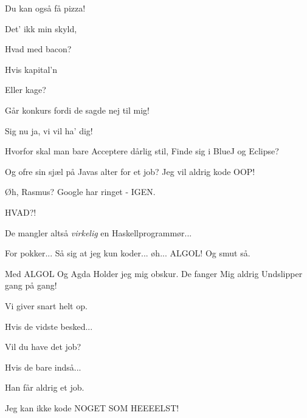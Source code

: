 \documentclass[a4paper,11pt]{article}
\begin{document}
\begin{song}
Du kan også få pizza!

Det' ikk min skyld,

Hvad med bacon?

Hvis kapital'n

Eller kage?

Går konkurs fordi de sagde nej til mig!

Sig nu ja, vi vil ha' dig!

Hvorfor skal man bare
Acceptere dårlig stil,
Finde sig i BlueJ og Eclipse?

Og ofre sin sjæl på
Javas alter for et job?
Jeg vil aldrig kode OOP!
\end{song}

\begin{sketch}

 Øh, Rasmus? Google har ringet - IGEN.

 HVAD?!

 De mangler altså \textit{virkelig} en Haskellprogrammør...

 For pokker... Så sig at jeg kun koder... øh... ALGOL! Og smut så.
\end{sketch}

\begin{song}
Med ALGOL
Og Agda
Holder jeg mig obskur.
De fanger
Mig aldrig
Undslipper gang på gang!

Vi giver snart helt op.

Hvis de vidste besked...

Vil du have det job?

Hvis de bare indså...

Han får aldrig et job.


Jeg kan ikke kode
NOGET
SOM
HEEEELST!

\end{song}
\end{document}
